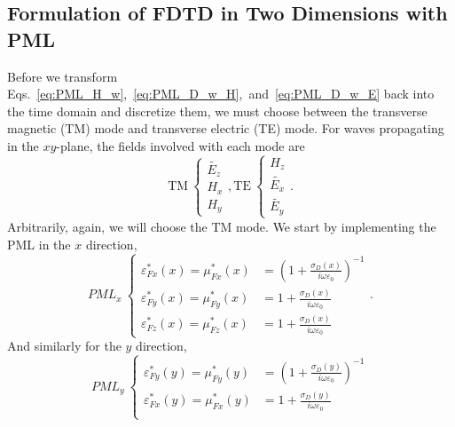 \documentclass[12pt]{article}
\begin{document}
\begin{multicols}{2}
\section{Formulation of FDTD in Two Dimensions with PML}
Before we transform Eqs.~\ref{eq:PML_H_w},~\ref{eq:PML_D_w_H},~and~\ref{eq:PML_D_w_E} back into the time domain and discretize them, we must choose between the transverse magnetic (TM) mode and transverse electric (TE) mode. For waves propagating in the $xy$-plane, the fields involved with each mode are
\begin{subequations}
\begin{equation}
\mathrm{TM}~\left\{\begin{split}
\tilde{E_z}\\
H_x\\
H_y
\end{split}\right.,
\end{equation}
\begin{equation}
\mathrm{TE}~\left\{\begin{split}
H_z\\
\tilde{E_x}\\
\tilde{E_y}
\end{split}\right..
\end{equation}
\end{subequations}
Arbitrarily, again, we will choose the TM mode. We start by implementing the PML in the $x$ direction,
\begin{subequations}
\begin{equation}
\textit{PML}_x~\left\{\begin{split}
\varepsilon_{Fx}^*(x)=\mu_{Fx}^*(x)&=\left(1+\frac{\sigma_D(x)}{i\omega\varepsilon_0}\right)^{-1}\\
\varepsilon_{Fy}^*(x)=\mu_{Fy}^*(x)&=1+\frac{\sigma_D(x)}{i\omega\varepsilon_0}\\
\varepsilon_{Fz}^*(x)=\mu_{Fz}^*(x)&=1+\frac{\sigma_D(x)}{i\omega\varepsilon_0}
\end{split}\right..
\end{equation}
\end{subequations}
And similarly for the $y$ direction,
\begin{subequations}
\begin{equation}
\textit{PML}_y~\left\{\begin{split}
\varepsilon_{Fy}^*(y)=\mu_{Fy}^*(y)&=\left(1+\frac{\sigma_D(y)}{i\omega\varepsilon_0}\right)^{-1}\\
\varepsilon_{Fx}^*(y)=\mu_{Fx}^*(y)&=1+\frac{\sigma_D(y)}{i\omega\varepsilon_0}\\

\end{split}
\end{equation}
\end{subequations}
\end{multicols}
\end{document}
